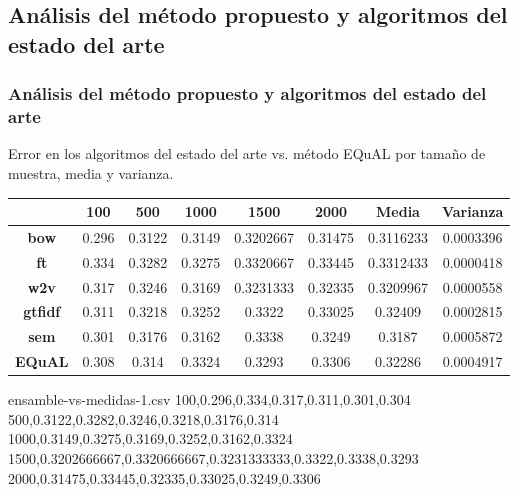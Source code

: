 \subsection{Análisis del método propuesto y algoritmos del estado del arte}
\begin{frame}
	\frametitle{Análisis del método propuesto y algoritmos del estado del arte}
	Error en los algoritmos del estado del arte vs. método EQuAL por tamaño de muestra, media y varianza.
	\begin{table}[h!]
		\scriptsize
		\begin{tabularx}{\textwidth}{cccccccc}
			\toprule
			& \textbf{100} & \textbf{500} & \textbf{1000} & \textbf{1500} & \textbf{2000} & \textbf{Media} & \textbf{Varianza} \\
			\midrule
			\textbf{bow}      & 0.296 & 0.3122 & 0.3149 & 0.3202667 & 0.31475 & \cellcolor[HTML]{D9EAD3}0.3116233 & 0.0003396                          \\
			\textbf{ft}       & 0.334 & 0.3282 & 0.3275 & 0.3320667 & 0.33445 & 0.3312433                         & \cellcolor[HTML]{D9EAD3}0.0000418 \\
			\textbf{w2v}      & 0.317 & 0.3246 & 0.3169 & 0.3231333 & 0.32335 & 0.3209967                         & 0.0000558                         \\
			\textbf{gtfidf}   & 0.311 & 0.3218 & 0.3252 & 0.3322       & 0.33025 & 0.32409                              & 0.0002815                              \\
			\textbf{sem}      & 0.301 & 0.3176 & 0.3162 & 0.3338       & 0.3249  & 0.3187                               & 0.0005872                                \\
			\textbf{EQuAL} & 0.308 & 0.314  & 0.3324 & 0.3293       & 0.3306  & 0.32286                              & 0.0004917                              \\
			\bottomrule
		\end{tabularx}
		\label{tab:error-arte-equal}
	\end{table}

	\framebreak

	\begin{filecontents*}{ensamble-vs-medidas-1.csv}
		100,0.296,0.334,0.317,0.311,0.301,0.304
		500,0.3122,0.3282,0.3246,0.3218,0.3176,0.314
		1000,0.3149,0.3275,0.3169,0.3252,0.3162,0.3324
		1500,0.3202666667,0.3320666667,0.3231333333,0.3322,0.3338,0.3293
		2000,0.31475,0.33445,0.32335,0.33025,0.3249,0.3306
	\end{filecontents*}


\end{frame}
